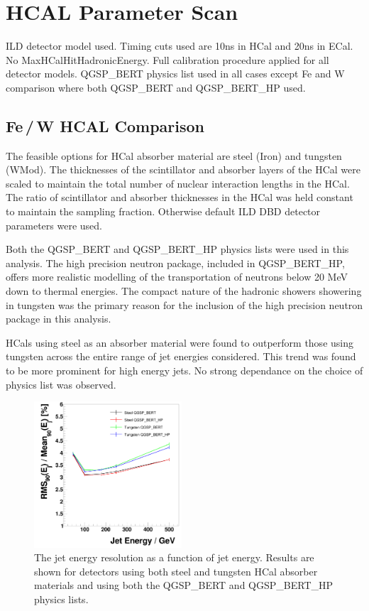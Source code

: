 \documentclass[final,3p,times,twocolumn]{elsarticle}
\begin{document}

\section{HCAL Parameter Scan}
ILD detector model used.  Timing cuts used are 10ns in HCal and 20ns in ECal.  No MaxHCalHitHadronicEnergy.  Full calibration procedure applied for all detector models.  
QGSP\_BERT physics list used in all cases except Fe and W comparison where both QGSP\_BERT and QGSP\_BERT\_HP used. 

\subsection{Fe\,/\,W HCAL Comparison}
The feasible options for HCal absorber material are steel (Iron) and tungsten (WMod).  The thicknesses of the scintillator and absorber layers of the HCal were scaled to maintain the total number of nuclear interaction lengths in the HCal.  The ratio of scintillator and absorber thicknesses in the HCal was held constant to maintain the sampling fraction.  Otherwise default ILD DBD detector parameters were used.

Both the QGSP\_BERT and QGSP\_BERT\_HP physics lists were used in this analysis.  The high precision neutron package, included in QGSP\_BERT\_HP, offers more realistic modelling of the transportation of neutrons below 20 MeV down to thermal energies.  The compact nature of the hadronic showers showering in tungsten was the primary reason for the inclusion of the high precision neutron package in this analysis.

HCals using steel as an absorber material were found to outperform those using tungsten across the entire range of jet energies considered.  This trend was found to be more prominent for high energy jets.  No strong dependance on the choice of physics list was observed.

\begin{figure}[!h]
  \begin{center}
     \includegraphics[width=0.49\textwidth]{JERvsJetEnergy_HCalMaterialHCalTC10ns.png}
     \caption{The jet energy resolution as a function of jet energy.  Results are shown for detectors using both steel and tungsten HCal absorber materials and using both the QGSP\_BERT and QGSP\_BERT\_HP physics lists.  \label{}}
  \end{center}
\end{figure}
\end{document}
